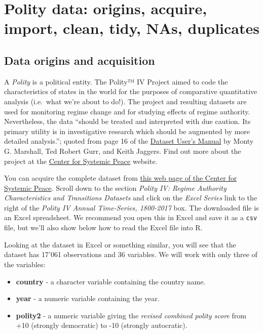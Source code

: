 \documentclass[]{book}
\providecommand{\tightlist}{%
  \setlength{\itemsep}{0pt}\setlength{\parskip}{0pt}}
\begin{document}
\hypertarget{polity-data-origins-acquire-import-clean-tidy-nas-duplicates}{%
\section{Polity data: origins, acquire, import, clean, tidy, NAs, duplicates}\label{polity-data-origins-acquire-import-clean-tidy-nas-duplicates}}

\hypertarget{data-origins-and-acquisition}{%
\subsection{Data origins and acquisition}\label{data-origins-and-acquisition}}

A \emph{Polity} is a political entity. The Polity™ IV Project aimed to code the characteristics of states in the world for the purposes of comparative quantitative analysis (i.e.~what we're about to do!). The project and resulting datasets are used for monitoring regime change and for studying effects of regime authority. Nevertheless, the data ``should be treated and interpreted with due caution. Its primary utility is in investigative research which should be augmented by more detailed analysis.''; quoted from page 16 of the \href{https://www.systemicpeace.org/inscr/p4manualv2016.pdf}{Dataset User's Manual} by Monty G. Marshall, Ted Robert Gurr, and Keith Jaggers. Find out more about the project at the \href{http://www.systemicpeace.org/polityproject.html}{Center for Systemic Peace} website.

You can acquire the complete dataset from \href{http://www.systemicpeace.org/inscrdata.html}{this web page of the Center for Systemic Peace}. Scroll down to the section \emph{Polity IV: Regime Authority Characteristics and Transitions Datasets} and click on the \emph{Excel Series} link to the right of the \emph{Polity IV Annual Time-Series, 1800-2017} box. The downloaded file is an Excel spreadsheet. We recommend you open this in Excel and save it as a \texttt{csv} file, but we'll also show below how to read the Excel file into R.

Looking at the dataset in Excel or something similar, you will see that the dataset has 17'061 observations and 36 variables. We will work with only three of the variables:

\begin{itemize}
\tightlist
\item
  \textbf{country} - a character variable containing the country name.
\item
  \textbf{year} - a numeric variable containing the year.
\item
  \textbf{polity2} - a numeric variable giving the \emph{revised combined polity score} from +10 (strongly democratic) to -10 (strongly autocratic).
\end{itemize}
\end{document}
